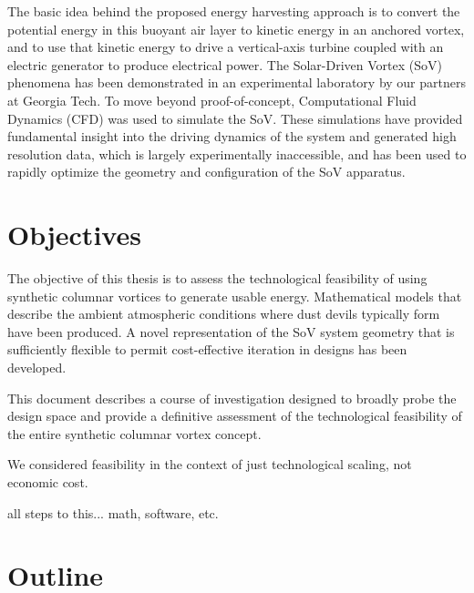 The basic idea behind the proposed energy harvesting approach is to
convert the potential energy in this buoyant air layer to kinetic energy
in an anchored vortex, and to use that kinetic energy to drive a
vertical-axis turbine coupled with an electric generator  to
produce electrical power. 
The Solar-Driven Vortex (SoV) phenomena has been demonstrated in
an experimental laboratory by our partners at Georgia Tech. To 
move beyond proof-of-concept, Computational Fluid 
Dynamics (CFD) was used to simulate the SoV. These simulations have 
provided fundamental insight into the driving dynamics of the system and 
generated high resolution data, which is largely experimentally
inaccessible, and has been used to rapidly optimize the geometry and
configuration of the SoV apparatus. 

\section{Objectives}

The objective of this thesis is to assess the technological feasibility of 
using synthetic columnar vortices to generate usable
energy. Mathematical models that describe the ambient atmospheric
conditions where dust devils typically form have been produced. A novel
representation of the SoV system geometry that is sufficiently flexible
to permit cost-effective iteration in designs has been developed. 


This
document describes a course of investigation designed to broadly probe the
design space and provide a definitive assessment of the technological
feasibility of the entire synthetic columnar vortex concept. 

We considered feasibility in the context of just technological scaling,
not economic cost.  

all steps to this... math, software, etc. 

\section{Outline}

